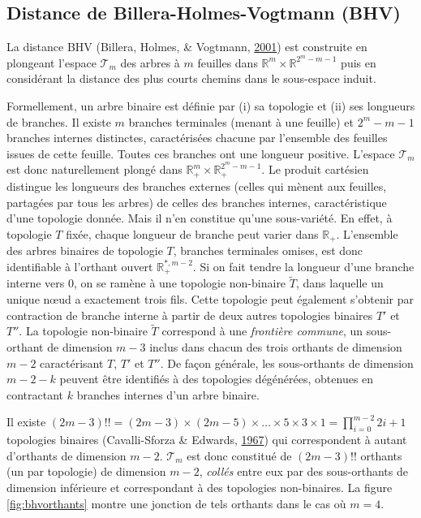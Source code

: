 \documentclass[12pt,a4paper]{reedthesis}
\newcommand \RR {\mathbb{R}}
\theoremstyle{definition}
\theoremstyle{definition}
\theoremstyle{definition}
\theoremstyle{remark}
\begin{document}
\hypertarget{distance-de-billera-holmes-vogtmann-bhv}{%
\subsection{Distance de Billera-Holmes-Vogtmann (BHV)}\label{distance-de-billera-holmes-vogtmann-bhv}}

La distance BHV (Billera, Holmes, \& Vogtmann, \protect\hyperlink{ref-billera2001geometry}{2001}) est construite en plongeant l'espace \(\mathscr{T}_m\) des arbres à \(m\) feuilles dans \(\RR^m \times \RR^{2^{m}-m-1}\) puis en considérant la distance des plus courts chemins dans le sous-espace induit.

Formellement, un arbre binaire est définie par (i) sa topologie et (ii) ses longueurs de branches. Il existe \(m\) branches terminales (menant à une feuille) et \(2^{m} - m - 1\) branches internes distinctes, caractérisées chacune par l'ensemble des feuilles issues de cette feuille. Toutes ces branches ont une longueur positive. L'espace \(\mathscr{T}_m\) est donc naturellement plongé dans \(\RR_+^m \times \RR_+^{2^{m}-m-1}\). Le produit cartésien distingue les longueurs des branches externes (celles qui mènent aux feuilles, partagées par tous les arbres) de celles des branches internes, caractéristique d'une topologie donnée. Mais il n'en constitue qu'une sous-variété. En effet, à topologie \(T\) fixée, chaque longueur de branche peut varier dans \(\RR_+\). L'ensemble des arbres binaires de topologie \(T\), branches terminales omises, est donc identifiable à l'orthant ouvert \(\RR_+^{*, m-2}\). Si on fait tendre la longueur d'une branche interne vers \(0\), on se ramène à une topologie non-binaire \(\tilde{T}\), dans laquelle un unique nœud a exactement trois fils. Cette topologie peut également s'obtenir par contraction de branche interne à partir de deux autres topologies binaires \(T'\) et \(T''\). La topologie non-binaire \(\tilde{T}\) correspond à une \emph{frontière commune}, un sous-orthant de dimension \(m-3\) inclus dans chacun des trois orthants de dimension \(m-2\) caractérisant \(T\), \(T'\) et \(T''\). De façon générale, les sous-orthants de dimension \(m - 2 - k\) peuvent être identifiés à des topologies dégénérées, obtenues en contractant \(k\) branches internes d'un arbre binaire.

Il existe \((2m-3)!! = (2m-3)\times(2m-5)\times\dots\times5 \times 3 \times 1 = \prod_{i = 0}^{m-2} 2i+1\) topologies binaires (Cavalli-Sforza \& Edwards, \protect\hyperlink{ref-cavalli1967phylogenetic}{1967}) qui correspondent à autant d'orthants de dimension \(m-2\). \(\mathscr{T}_m\) est donc constitué de \((2m-3)!!\) orthants (un par topologie) de dimension \(m-2\), \emph{collés} entre eux par des sous-orthants de dimension inférieure et correspondant à des topologies non-binaires. La figure \ref{fig:bhvorthants} montre une jonction de tels orthants dans le cas où \(m=4\).
\end{document}
